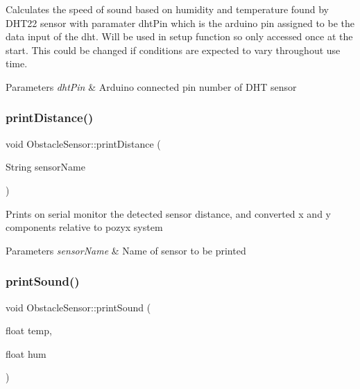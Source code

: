 Calculates the speed of sound based on humidity and temperature found by D\+H\+T22 sensor with paramater dht\+Pin which is the arduino pin assigned to be the data input of the dht. Will be used in setup function so only accessed once at the start. This could be changed if conditions are expected to vary throughout use time. 
\begin{DoxyParams}{Parameters}
{\em dht\+Pin} & Arduino connected pin number of D\+HT sensor \\
\hline
\end{DoxyParams}
\mbox{\label{class_obstacle_sensor_ad7b512504389e1925d3777f7395ef3ae}} 
\subsubsection{\texorpdfstring{print\+Distance()}{printDistance()}}
{\footnotesize\ttfamily void Obstacle\+Sensor\+::print\+Distance (\begin{DoxyParamCaption}\item[{String}]{sensor\+Name }\end{DoxyParamCaption})}

Prints on serial monitor the detected sensor distance, and converted x and y components relative to pozyx system 
\begin{DoxyParams}{Parameters}
{\em sensor\+Name} & Name of sensor to be printed \\
\hline
\end{DoxyParams}
\mbox{\label{class_obstacle_sensor_a66ce921e669bb83fa8f23ad2bc2733ee}} 
\subsubsection{\texorpdfstring{print\+Sound()}{printSound()}}
{\footnotesize\ttfamily void Obstacle\+Sensor\+::print\+Sound (\begin{DoxyParamCaption}\item[{float}]{temp,  }\item[{float}]{hum }\end{DoxyParamCaption})\hspace{0.3cm}{\ttfamily [static]}}


